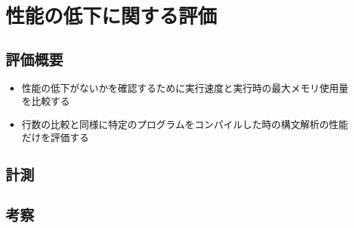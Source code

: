 \chapter{性能の低下に関する評価}
\label{performance}

\section{評価概要}

\begin{itemize}
    \item 性能の低下がないかを確認するために実行速度と実行時の最大メモリ使用量を比較する
    \item 行数の比較と同様に特定のプログラムをコンパイルした時の構文解析の性能だけを評価する
\end{itemize}

\section{計測}

\section{考察}

